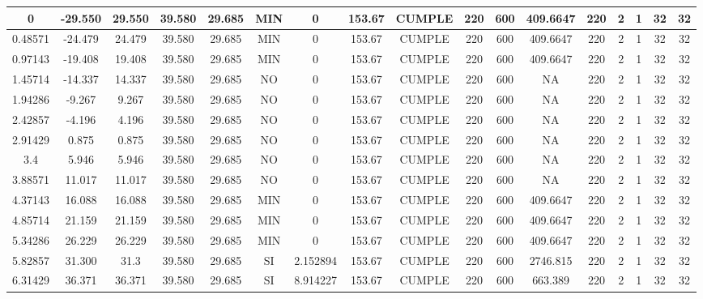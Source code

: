 \begin{table}[h]
{\begin{tabular}{|c|c|c|c|c|c|c|c|c|c|c|c|c|c|c|c|c|}
     \hline
    0   & -29.550 & 29.550 & 39.580 & 29.685 & MIN & 0   & 153.67 & CUMPLE & 220 & 600 & 409.6647 & 220 & 2   & 1   & 32  & 32 \bigstrut\\
    \hline
    0.48571 & -24.479 & 24.479 & 39.580 & 29.685 & MIN & 0   & 153.67 & CUMPLE & 220 & 600 & 409.6647 & 220 & 2   & 1   & 32  & 32 \bigstrut\\
    \hline
    0.97143 & -19.408 & 19.408 & 39.580 & 29.685 & MIN & 0   & 153.67 & CUMPLE & 220 & 600 & 409.6647 & 220 & 2   & 1   & 32  & 32 \bigstrut\\
    \hline
    1.45714 & -14.337 & 14.337 & 39.580 & 29.685 & NO  & 0   & 153.67 & CUMPLE & 220 & 600 & NA  & 220 & 2   & 1   & 32  & 32 \bigstrut\\
    \hline
    1.94286 & -9.267 & 9.267 & 39.580 & 29.685 & NO  & 0   & 153.67 & CUMPLE & 220 & 600 & NA  & 220 & 2   & 1   & 32  & 32 \bigstrut\\
    \hline
    2.42857 & -4.196 & 4.196 & 39.580 & 29.685 & NO  & 0   & 153.67 & CUMPLE & 220 & 600 & NA  & 220 & 2   & 1   & 32  & 32 \bigstrut\\
    \hline
    2.91429 & 0.875 & 0.875 & 39.580 & 29.685 & NO  & 0   & 153.67 & CUMPLE & 220 & 600 & NA  & 220 & 2   & 1   & 32  & 32 \bigstrut\\
    \hline
    3.4 & 5.946 & 5.946 & 39.580 & 29.685 & NO  & 0   & 153.67 & CUMPLE & 220 & 600 & NA  & 220 & 2   & 1   & 32  & 32 \bigstrut\\
    \hline
    3.88571 & 11.017 & 11.017 & 39.580 & 29.685 & NO  & 0   & 153.67 & CUMPLE & 220 & 600 & NA  & 220 & 2   & 1   & 32  & 32 \bigstrut\\
    \hline
    4.37143 & 16.088 & 16.088 & 39.580 & 29.685 & MIN & 0   & 153.67 & CUMPLE & 220 & 600 & 409.6647 & 220 & 2   & 1   & 32  & 32 \bigstrut\\
    \hline
    4.85714 & 21.159 & 21.159 & 39.580 & 29.685 & MIN & 0   & 153.67 & CUMPLE & 220 & 600 & 409.6647 & 220 & 2   & 1   & 32  & 32 \bigstrut\\
    \hline
    5.34286 & 26.229 & 26.229 & 39.580 & 29.685 & MIN & 0   & 153.67 & CUMPLE & 220 & 600 & 409.6647 & 220 & 2   & 1   & 32  & 32 \bigstrut\\
    \hline
    5.82857 & 31.300 & 31.3 & 39.580 & 29.685 & SI  & 2.152894 & 153.67 & CUMPLE & 220 & 600 & 2746.815 & 220 & 2   & 1   & 32  & 32 \bigstrut\\
    \hline
    6.31429 & 36.371 & 36.371 & 39.580 & 29.685 & SI  & 8.914227 & 153.67 & CUMPLE & 220 & 600 & 663.389 & 220 & 2   & 1   & 32  & 32 \bigstrut\\

\end{tabular}}
\end{table}
